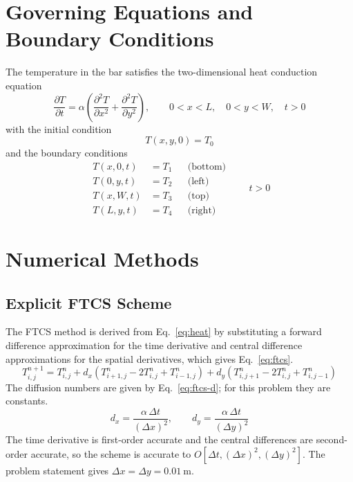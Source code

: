 \documentclass[conf]{new-aiaa}
\begin{document}
\section{Governing Equations and Boundary Conditions}
The temperature in the bar satisfies the two-dimensional heat conduction equation
\begin{equation}
  \frac{\partial T}{\partial t}
  = \alpha \left( \frac{\partial^2 T}{\partial x^2}
                + \frac{\partial^2 T}{\partial y^2} \right),
  \qquad 0 < x < L,\quad 0 < y < W,\quad t > 0
  \label{eq:heat}
\end{equation}
with the initial condition
\begin{equation}
  T(x, y, 0) = T_0
  \label{eq:ic}
\end{equation}
and the boundary conditions
\begin{equation}
  \begin{aligned}
    T(x, 0, t) &= T_1 && \text{(bottom)} \\
    T(0, y, t) &= T_2 && \text{(left)}   \\
    T(x, W, t) &= T_3 && \text{(top)}    \\
    T(L, y, t) &= T_4 && \text{(right)}
  \end{aligned}
  \qquad t > 0
  \label{eq:bc}
\end{equation}
\FloatBarrier
\section{Numerical Methods}

\subsection{Explicit FTCS Scheme}
The FTCS method is derived from Eq.~\eqref{eq:heat} by substituting a forward difference approximation
for the time derivative and central difference approximations for the spatial derivatives, which gives
Eq.~\eqref{eq:ftcs}.
\begin{equation}
\label{eq:ftcs}
T^{n+1}_{i,j} = T^{n}_{i,j}
 + d_x \left( T^{n}_{i+1,j} - 2T^{n}_{i,j} + T^{n}_{i-1,j} \right)
 + d_y \left( T^{n}_{i,j+1} - 2T^{n}_{i,j} + T^{n}_{i,j-1} \right)
\end{equation}
The diffusion numbers are given by Eq.~\eqref{eq:ftcs-d}; for this problem they are constants.
\begin{equation}
  d_x = \frac{\alpha\,\Delta t}{(\Delta x)^2}, \qquad
  d_y = \frac{\alpha\,\Delta t}{(\Delta y)^2}
  \label{eq:ftcs-d}
\end{equation}
The time derivative is first-order accurate and the central differences are second-order accurate, so the
scheme is accurate to $O[\Delta t, (\Delta x)^2, (\Delta y)^2]$. The problem statement gives
$\Delta x = \Delta y = \SI{0.01}{\metre}$.
\end{document}
